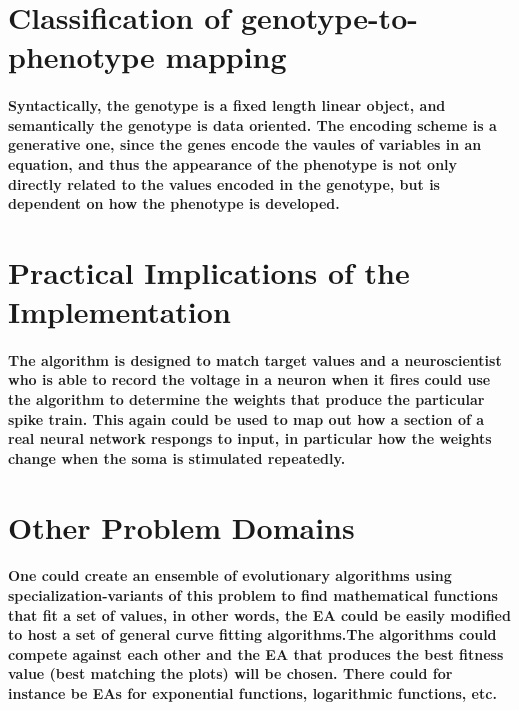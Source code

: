 \documentclass[titlepage,norsk]{article}
\begin{document}
\section{Classification of genotype-to-phenotype mapping}
\paragraph{Syntactically, the genotype is a fixed length linear object, and semantically the genotype is data oriented. The encoding scheme is a generative one, since the genes encode the vaules of variables in an equation, and thus the appearance of the phenotype is not only directly related to the values encoded in the genotype, but is dependent on how the phenotype is developed.}

\section{Practical Implications of the Implementation}
\paragraph{The algorithm is designed to match target values and a neuroscientist who is able to record the voltage in a neuron when it fires could use the algorithm to determine the weights that produce the particular spike train. This again could be used to map out how a section of a real neural network respongs to input, in particular how the weights change when the soma is stimulated repeatedly.}
\section{Other Problem Domains}

\paragraph{
One could create an ensemble of evolutionary algorithms using specialization-variants of this problem to find mathematical functions that fit a set of values, in other words, the EA could be easily modified to host a set of general curve fitting algorithms.The algorithms could compete against each other and the EA that produces the best fitness value (best matching the plots) will be chosen. There could for instance be EAs for exponential functions, logarithmic functions, etc. 
}
\end{document}
